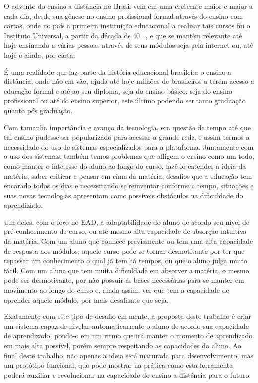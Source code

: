 O advento do ensino a distância no Brasil vem em uma crescente maior e maior a cada dia, desde sua gênese no ensino profissional formal através do ensino com cartas, onde no país a primeira instituição educacional a realizar tais cursos foi o Instituto Universal, a partir da década de 40 ~\cite{instituto_universal}, e que se mantém relevante até hoje ensinando a várias pessoas através de seus módulos seja pela internet ou, até hoje e ainda, por carta. 

É uma realidade que faz parte da história educacional brasileira o ensino a distância, onde não em vão, ajuda até hoje milhões de brasileiros a terem acesso a educação formal e até ao seu diploma, seja do ensino básico, seja do ensino profissional ou até do ensino superior, este último podendo ser tanto graduação quanto pós graduação. 

Com tamanha importância e avanço da tecnologia, era questão de tempo até que tal ensino pudesse ser popularizado para acessar a grande rede, e assim termos a necessidade do uso de sistemas especializados para a plataforma. Juntamente com o uso dos sistemas, também temos problemas que afligem o ensino como um todo, como manter o interesse do aluno ao longo do curso, fazê-lo entender a ideia da matéria, saber criticar e pensar em cima da matéria, desafios que a educação tem encarado todos os dias e necessitando se reinventar conforme o tempo, situações e suas novas tecnologias apresentam como possíveis obstáculos na dificuldade do aprendizado. 

Um deles, com o foco no EAD, a adaptabilidade do aluno de acordo seu nível de pré-conhecimento do curso, ou até mesmo alta capacidade de absorção intuitiva da matéria. Com um aluno que conhece previamente ou tem uma alta capacidade de resposta aos módulos, aquele curso pode se tornar desmotivante por ter que repassar um conhecimento o qual já tem há tempos, ou que o aluno julga muito fácil. Com um aluno que tem muita dificuldade em absorver a matéria, o mesmo pode ser desmotivante, por não possuir as bases necessárias para se manter em movimento ao longo do curso e, ainda assim, ver que tem a capacidade de aprender aquele módulo, por mais desafiante que seja. 

Exatamente com este tipo de desafio em mente, a proposta deste trabalho é criar um sistema capaz de nivelar automaticamente o aluno de acordo sua capacidade de aprendizado, pondo-o em um ritmo que irá manter o momento de aprendizado em mais alta possível, porém sempre respeitando as capacidades do aluno. Ao final deste trabalho, não apenas a ideia será maturada para desenvolvimento, mas um protótipo funcional, que pode mostrar na prática como esta ferramenta poderá auxiliar e revolucionar na capacidade do ensino a distância para o futuro.

